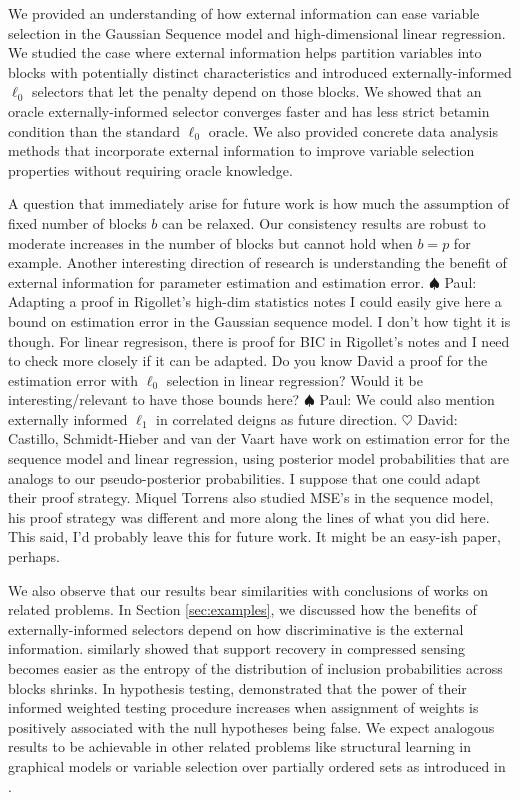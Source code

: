 \documentclass[aos]{imsart}
\theoremstyle{plain}
\newcommand{\david}[1]{{\small{\color{blue} \sf $\heartsuit$ David: #1}}}
\newcommand{\paul}[1]{{\small{\color{green} \sf $\spadesuit$ Paul: #1}}}
\begin{document}
We provided an understanding of how external information can ease variable selection in the Gaussian Sequence model and high-dimensional linear regression. We studied the case where external information helps partition variables into blocks with potentially distinct characteristics and introduced externally-informed $\ell_0$ selectors that let the penalty depend on those blocks. We showed that an oracle externally-informed selector converges faster and has less strict betamin condition than the standard $\ell_0$ oracle. We also provided concrete data analysis methods that incorporate external information to improve variable selection properties without requiring oracle knowledge.

A question that immediately arise for future work is how much the assumption of fixed number of blocks $b$ can be relaxed. Our consistency results are robust to moderate increases in the number of blocks but cannot hold when $b=p$ for example. Another interesting direction of research is understanding the benefit of external information for parameter estimation and estimation error. \paul{Adapting a proof in Rigollet's high-dim statistics notes I could easily give here a bound on estimation error in the Gaussian sequence model. I don't how tight it is though. For linear regresison, there is proof for BIC in Rigollet's notes and I need to check more closely if it can be adapted. Do you know David a proof for the estimation error with $\ell_0$ selection in linear regression? Would it be interesting/relevant to have those bounds here?} \paul{We could also mention externally informed $\ell_1$ in correlated deigns as future direction.}
\david{Castillo, Schmidt-Hieber and van der Vaart have work on estimation error for the sequence model and linear regression, using posterior model probabilities that are analogs to our pseudo-posterior probabilities. I suppose that one could adapt their proof strategy. Miquel Torrens also studied MSE's in the sequence model, his proof strategy was different and more along the lines of what you did here. This said, I'd probably leave this for future work. It might be an easy-ish paper, perhaps.}

We also observe that our results bear similarities with conclusions of works on related problems. In Section \ref{sec:examples}, we discussed how the benefits of externally-informed selectors depend on how discriminative is the external information. \cite{scarlett2012compressed} similarly showed that support recovery in compressed sensing becomes easier as the entropy of the distribution of inclusion probabilities across blocks shrinks. In hypothesis testing, \cite{genovese2006} demonstrated that the power of their informed weighted testing procedure increases when assignment of weights is positively associated with the null hypotheses being false. We expect analogous results to be achievable in other related problems like structural learning in graphical models or variable selection over partially ordered sets as introduced in \cite{taeb}. 
\end{document}
